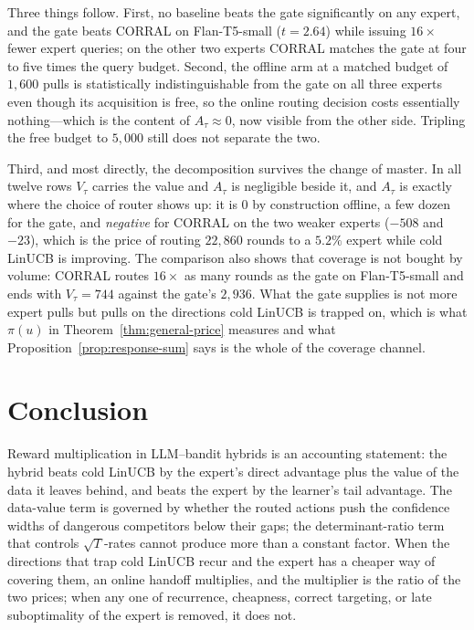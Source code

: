 \documentclass{article}
\theoremstyle{definition}
\theoremstyle{remark}
\theoremstyle{remark}
\begin{document}
Three things follow. First, no baseline beats the gate significantly on any
expert, and the gate beats CORRAL on Flan-T5-small ($t=2.64$) while issuing
$16\times$ fewer expert queries; on the other two experts CORRAL matches the
gate at four to five times the query budget. Second, the offline arm at a
matched budget of $1{,}600$ pulls is statistically indistinguishable from the
gate on all three experts even though its acquisition is free, so the online
routing decision costs essentially nothing---which is the content of
$A_\tau\approx0$, now visible from the other side. Tripling the free budget to
$5{,}000$ still does not separate the two.

Third, and most directly, the decomposition survives the change of master. In
all twelve rows $V_\tau$ carries the value and $A_\tau$ is negligible beside
it, and $A_\tau$ is exactly where the choice of router shows up: it is $0$ by
construction offline, a few dozen for the gate, and \emph{negative} for CORRAL
on the two weaker experts ($-508$ and $-23$), which is the price of routing
$22{,}860$ rounds to a $5.2\%$ expert while cold LinUCB is improving. The
comparison also shows that coverage is not bought by volume: CORRAL routes
$16\times$ as many rounds as the gate on Flan-T5-small and ends with
$V_\tau=744$ against the gate's $2{,}936$. What the gate supplies is not more
expert pulls but pulls on the directions cold LinUCB is trapped on, which is
what $\pi(u)$ in Theorem~\ref{thm:general-price} measures and what
Proposition~\ref{prop:response-sum} says is the whole of the coverage channel.

\section{Conclusion}
\label{sec:conclusion}

Reward multiplication in LLM--bandit hybrids is an accounting statement: the
hybrid beats cold LinUCB by the expert's direct advantage plus the value of the
data it leaves behind, and beats the expert by the learner's tail advantage.
The data-value term is governed by whether the routed actions push the
confidence widths of dangerous competitors below their gaps; the
determinant-ratio term that controls $\sqrt T$-rates cannot produce more than
a constant factor. When the directions that trap cold LinUCB recur and the
expert has a cheaper way of covering them, an online handoff multiplies, and
the multiplier is the ratio of the two prices; when any one of recurrence,
cheapness, correct targeting, or late suboptimality of the expert is removed,
it does not.
\end{document}
